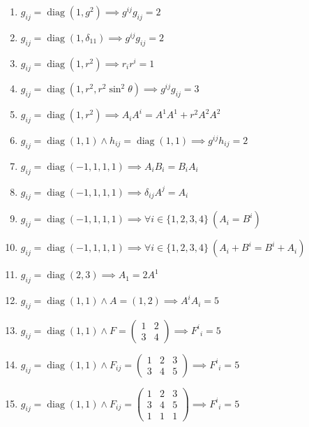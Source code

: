 \documentclass[11pt,a4paper]{article}
\begin{document}
\begin{enumerate}
\item $\displaystyle g_{ij} = \operatorname{diag}(1, g^{2}) \implies g^{ij} g_{ij} = 2$
\item $\displaystyle g_{ij} = \operatorname{diag}(1, \delta_{11}) \implies g^{ij} g_{ij} = 2$
\item $\displaystyle g_{ij} = \operatorname{diag}(1, r^{2}) \implies r_{i} r^{i} = 1$
\item $\displaystyle g_{ij} = \operatorname{diag}(1, r^{2}, r^{2} \sin^{2}\theta) \implies g^{ij} g_{ij} = 3$
\item $\displaystyle g_{ij} = \operatorname{diag}(1, r^{2}) \implies A_{i} A^{i} = A^{1} A^{1} + r^{2} A^{2} A^{2}$
\item $\displaystyle g_{ij} = \operatorname{diag}(1, 1) \land h_{ij} = \operatorname{diag}(1, 1) \implies g^{ij} h_{ij} = 2$
\item $\displaystyle g_{ij} = \operatorname{diag}(-1, 1, 1, 1) \implies A_{i} B_{i} = B_{i} A_{i}$
\item $\displaystyle g_{ij} = \operatorname{diag}(-1, 1, 1, 1) \implies \delta_{ij} A^{j} = A_{i}$
\item $\displaystyle g_{ij} = \operatorname{diag}(-1, 1, 1, 1) \implies \forall i \in \{1, 2, 3, 4\}\ \left( A_{i} = B^{i} \right)$
\item $\displaystyle g_{ij} = \operatorname{diag}(-1, 1, 1, 1) \implies \forall i \in \{1, 2, 3, 4\}\ \left( A_{i} + B^{i} = B^{i} + A_{i} \right)$
\item $\displaystyle g_{ij} = \operatorname{diag}(2, 3) \implies A_{1} = 2 A^{1}$
\item $\displaystyle g_{ij} = \operatorname{diag}(1, 1) \land A = (1, 2) \implies A^{i} A_{i} = 5$
\item $\displaystyle g_{ij} = \operatorname{diag}(1, 1) \land F = \begin{pmatrix} 1 & 2 \\ 3 & 4 \end{pmatrix} \implies F^{i}{}_{i} = 5$
\item $\displaystyle g_{ij} = \operatorname{diag}(1, 1) \land F_{ij} = \begin{pmatrix} 1 & 2 & 3 \\ 3 & 4 & 5 \end{pmatrix} \implies F^{i}{}_{i} = 5$
\item $\displaystyle g_{ij} = \operatorname{diag}(1, 1) \land F_{ij} = \begin{pmatrix} 1 & 2 & 3 \\ 3 & 4 & 5 \\ 1 & 1 & 1 \end{pmatrix} \implies F^{i}{}_{i} = 5$

\end{enumerate}
\end{document}
